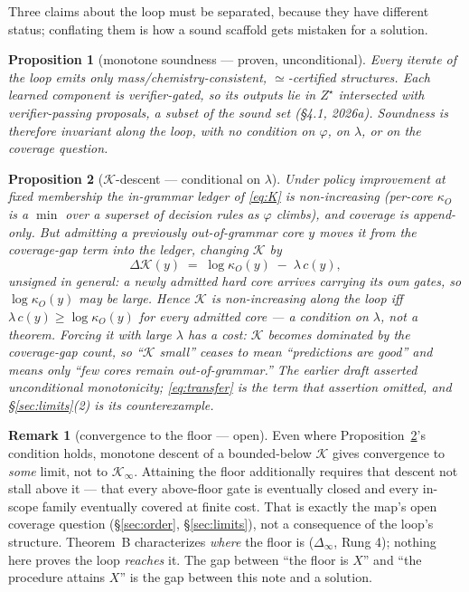\documentclass[11pt]{article}
\theoremstyle{plain}
\newtheorem{proposition}{Proposition}
\theoremstyle{definition}
\newtheorem{remark}{Remark}
\newcommand{\Zstar}{Z^{\star}}
\newcommand{\kO}{\kappa_{O}}
\begin{document}
Three claims about the loop must be separated, because they have different status; conflating them is how a sound scaffold gets mistaken for a solution.

\begin{proposition}[monotone soundness --- proven, unconditional]\label{prop:sound}
Every iterate of the loop emits only mass/chemistry-consistent, $\simeq$-certified structures. Each learned component is verifier-gated, so its outputs lie in $\Zstar$ intersected with verifier-passing proposals, a subset of the sound set (\S4.1, 2026a). Soundness is therefore invariant along the loop, with no condition on $\varphi$, on $\lambda$, or on the coverage question.
\end{proposition}

\begin{proposition}[$\mathcal{K}$-descent --- conditional on $\lambda$]\label{prop:descent}
Under policy improvement at fixed membership the in-grammar ledger of \eqref{eq:K} is non-increasing (per-core $\kO$ is a $\min$ over a superset of decision rules as $\varphi$ climbs), and coverage is append-only. But admitting a previously out-of-grammar core $y$ moves it from the coverage-gap term into the ledger, changing $\mathcal{K}$ by
\begin{equation}
\Delta\mathcal{K}(y)\;=\;\log\kO(y)\;-\;\lambda\,c(y),
\label{eq:transfer}
\end{equation}
\emph{unsigned in general}: a newly admitted hard core arrives carrying its own gates, so $\log\kO(y)$ may be large. Hence $\mathcal{K}$ is non-increasing along the loop \emph{iff} $\lambda\,c(y)\ge\log\kO(y)$ for every admitted core --- a condition on $\lambda$, not a theorem. Forcing it with large $\lambda$ has a cost: $\mathcal{K}$ becomes dominated by the coverage-gap count, so ``$\mathcal{K}$ small'' ceases to mean ``predictions are good'' and means only ``few cores remain out-of-grammar.'' The earlier draft asserted unconditional monotonicity; \eqref{eq:transfer} is the term that assertion omitted, and \S\ref{sec:limits}(2) is its counterexample.
\end{proposition}

\begin{remark}[convergence to the floor --- open]\label{rem:conv}
Even where Proposition~\ref{prop:descent}'s condition holds, monotone descent of a bounded-below $\mathcal{K}$ gives convergence to \emph{some} limit, not to $\mathcal{K}_\infty$. Attaining the floor additionally requires that descent not stall above it --- that every above-floor gate is eventually closed and every in-scope family eventually covered at finite cost. That is exactly the map's open coverage question (\S\ref{sec:order}, \S\ref{sec:limits}), not a consequence of the loop's structure. Theorem~B characterizes \emph{where} the floor is ($\Delta_\infty$, Rung 4); nothing here proves the loop \emph{reaches} it. The gap between ``the floor is $X$'' and ``the procedure attains $X$'' is the gap between this note and a solution.
\end{remark}
\end{document}
